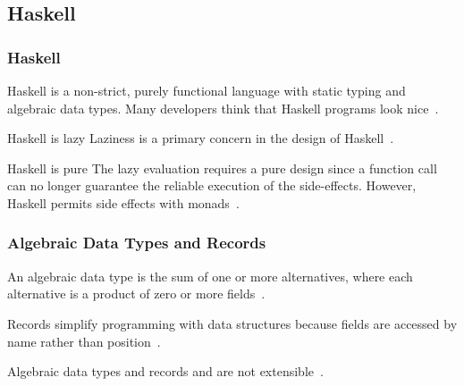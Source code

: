 \subsection{Haskell}

\begin{frame}\frametitle{Haskell}

Haskell is a non-strict, purely functional language with static typing and algebraic data types. Many developers think that Haskell programs look nice~\cite{history-of-haskell}.

\begin{block}{Haskell is lazy}
    Laziness is a primary concern in the design of Haskell~\cite{history-of-haskell}.
\end{block}

\begin{block}{Haskell is pure}
The lazy evaluation requires a pure design since a function call can no longer guarantee the reliable execution of the side-effects. However, Haskell permits side effects with monads~\cite{history-of-haskell}.
\end{block}

\end{frame}

\begin{frame}[allowframebreaks]\frametitle{Algebraic Data Types and Records}

An algebraic data type is the sum of one or more alternatives, where each alternative is a product of zero or more fields~\cite{history-of-haskell}. 
        

Records simplify programming with data structures because fields are accessed by name rather than position~\cite{lw-ext-records}.



Algebraic data types and records and are not extensible~\cite{lw-ext-records,trees-that-grow}. 

\end{frame}
